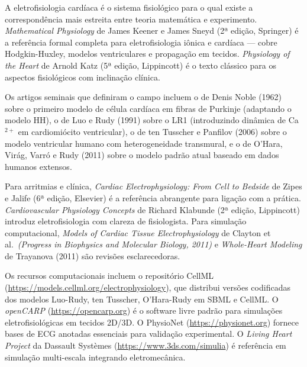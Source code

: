 {A eletrofisiologia cardíaca é o sistema fisiológico para o qual
existe a correspondência mais estreita entre teoria matemática e
experimento. \textit{Mathematical Physiology} de James Keener e James
Sneyd (2ª edição, Springer) é a referência formal completa para
eletrofisiologia iônica e cardíaca --- cobre Hodgkin-Huxley, modelos
ventriculares e propagação em tecidos. \textit{Physiology of the Heart}
de Arnold Katz (5ª edição, Lippincott) é o texto clássico para os
aspectos fisiológicos com inclinação clínica.

Os artigos seminais que definiram o campo incluem o de Denis Noble
(1962) sobre o primeiro modelo de célula cardíaca em fibras de Purkinje
(adaptando o modelo HH), o de Luo e Rudy (1991) sobre o LR1
(introduzindo dinâmica de Ca$^{2+}$ em cardiomiócito ventricular), o de
ten Tusscher e Panfilov (2006) sobre o modelo ventricular humano com
heterogeneidade transmural, e o de O'Hara, Virág, Varró e Rudy (2011)
sobre o modelo padrão atual baseado em dados humanos extensos.

Para arritmias e clínica, \textit{Cardiac Electrophysiology: From Cell to
Bedside} de Zipes e Jalife (6ª edição, Elsevier) é a referência
abrangente para ligação com a prática. \textit{Cardiovascular Physiology
Concepts} de Richard Klabunde (2ª edição, Lippincott) introduz
eletrofisiologia com clareza de fisiologista. Para simulação computacional,
\textit{Models of Cardiac Tissue Electrophysiology} de Clayton et al.\
\textit{(Progress in Biophysics and Molecular Biology, 2011)} e
\textit{Whole-Heart Modeling} de Trayanova (2011) são revisões
esclarecedoras.

Os recursos computacionais incluem o repositório CellML
(\url{https://models.cellml.org/electrophysiology}), que distribui versões
codificadas dos modelos Luo-Rudy, ten Tusscher, O'Hara-Rudy em SBML e
CellML. O \emph{openCARP} (\url{https://opencarp.org}) é o software
livre padrão para simulações eletrofisiológicas em tecidos 2D/3D. O
PhysioNet (\url{https://physionet.org}) fornece bases de ECG anotadas
essenciais para validação experimental. O \emph{Living Heart Project} da
Dassault Systèmes (\url{https://www.3ds.com/simulia}) é referência em
simulação multi-escala integrando eletromecânica.

}


